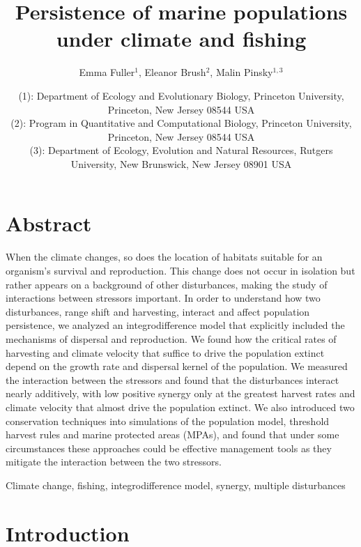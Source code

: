 \documentclass[12pt,english]{article}
\title{Persistence of marine populations under climate and fishing}
\author{Emma Fuller$^1$, Eleanor Brush$^2$, Malin Pinsky$^{1,3}$}
\date{\small (1): Department of Ecology and Evolutionary Biology, Princeton University, Princeton, New Jersey 08544 USA \\
(2): Program in Quantitative and Computational Biology, Princeton University, Princeton, New Jersey 08544 USA \\
(3): Department of Ecology, Evolution and Natural Resources, Rutgers University, New Brunswick, New Jersey 08901 USA}
\begin{document}
\maketitle
\pagebreak
\begin{spacing}{1.9}
\begin{flushleft}

\section{Abstract}

When the climate changes, so does the location of habitats suitable for an organism's survival and reproduction. This change does not occur in isolation but rather appears on a background of other disturbances, making the study of interactions between stressors important. In order to understand how two disturbances, range shift and harvesting, interact and affect population persistence, we analyzed an integrodifference model that explicitly included the mechanisms of dispersal and reproduction. We found how the critical rates of harvesting and climate velocity that suffice to drive the population extinct depend on the growth rate and dispersal kernel of the population.  We measured the interaction between the stressors and found that the disturbances interact nearly additively, with low positive synergy only at the greatest harvest rates and climate velocity that almost drive the population extinct. We also introduced two conservation techniques into simulations of the population model, threshold harvest rules and marine protected areas (MPAs), and found that under some circumstances these approaches could be effective management tools as they mitigate the interaction between the two stressors.  
\hspace{10cm}

 Climate change, fishing, integrodifference model, synergy, multiple disturbances

\section{Introduction}


\end{flushleft}
\end{spacing}
\end{document}
